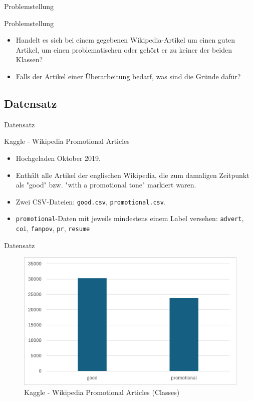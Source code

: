 \documentclass[aspectratio=169]{beamer} %
\begin{document}
\begin{frame}{Problemstellung}
    \begin{block}{Problemstellung}
        \begin{itemize}
            \item Handelt es sich bei einem gegebenen Wikipedia-Artikel um einen guten Artikel, um einen problematischen oder gehört er zu keiner der beiden Klassen?
            \item Falls der Artikel einer Überarbeitung bedarf, was sind die Gründe dafür?
        \end{itemize}
    \end{block}
\end{frame}

\subsection{Datensatz}

\begin{frame}{Datensatz}
    \begin{block}{Kaggle - Wikipedia Promotional Articles}
        \begin{itemize}
            \item Hochgeladen Oktober 2019.
            \item Enthält alle Artikel der englischen Wikipedia, die zum damaligen Zeitpunkt als "good" bzw. "with a promotional tone" markiert waren.
            \item Zwei CSV-Dateien: \texttt{good.csv}, \texttt{promotional.csv}.
            \item \texttt{promotional}-Daten mit jeweils mindestens einem Label versehen: \texttt{advert}, \texttt{coi}, \texttt{fanpov}, \texttt{pr}, \texttt{resume}
        \end{itemize}
    \end{block}
\end{frame}

\begin{frame}{Datensatz}
    \begin{figure}
        \centering
        \includegraphics[width=0.6\linewidth]{figures/kaggle-classes.png}
        \caption{Kaggle - Wikipedia Promotional Articles (Classes)}
    \end{figure}
\end{frame}
\end{document}
